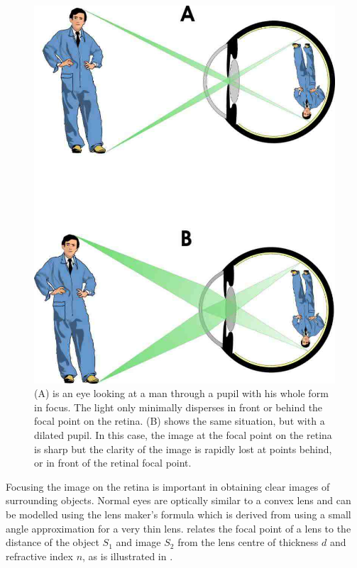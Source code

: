 \begin{figure}[H]
\centering
  \includegraphics{figures/light_path}
\caption{(A) is an eye looking at a man through a pupil with his whole form in focus.
		The light only minimally disperses in front or behind the focal point
		on the retina. (B) shows the same situation, but with a dilated pupil.
		In this case, the image at the focal point on the retina is sharp but
		the clarity of the image is rapidly lost at points behind, or in front
		of the retinal focal point.\cite{adrian1927action}}
\label{fig:light_journey}
\end{figure}

Focusing the image on the retina is important in obtaining clear images of
surrounding objects. Normal eyes are optically similar to a convex lens
and can be modelled using the lens maker's formula 
which is derived from  using a small angle approximation
for a very thin lens. relates the focal point of a lens to
the distance of the object $S_1$ and image $S_2$ from the lens centre of
thickness $d$ and refractive index $n$, as is illustrated in .

